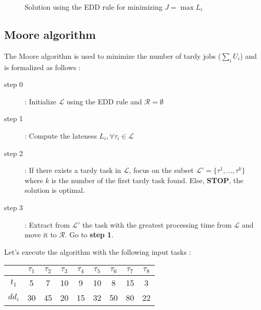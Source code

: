 \begin{figure}[h!]
    \centering
    \caption{\label{scheduling:sol_edd}Solution using the EDD rule for minimizing $J = \max L_i$}
\end{figure}

\subsection{Moore algorithm}

The Moore algorithm is used to minimize the number of tardy jobs ($\sum_i U_i$) and is formalized as follows : 
\begin{description}
    \item[step 0] : Initialize $\mathcal L$ using the EDD rule and $\mathcal R = \emptyset$
    \item[step 1] : Compute the lateness $L_i, \forall\tau_i\in\mathcal L$
    \item[step 2] : If there exists a tardy task in $\mathcal L$, focus on the subset $\mathcal L' = \{ \tau^1, ..., \tau^k \}$ where $k$ is the number of the first tardy task found. Else, \textbf{STOP}, the solution is optimal.
    \item[step 3] : Extract from $\mathcal L'$ the task with the greatest processing time from $\mathcal L$ and move it to $\mathcal R$. Go to \textbf{step 1}.
\end{description}

Let's execute the algorithm with the following input tasks : 
\begin{center}
    \begin{tabular}{|c|c|c|c|c|c|c|c|c|}
    \hline
        & $\tau_1$ & $\tau_2$ & $\tau_3$ & $\tau_4$ & $\tau_5$ & $\tau_6$ & $\tau_7$ & $\tau_8$\\\hline
    $t_1$ & 5 & 7 & 10 & 9 & 10 & 8 & 15 & 3\\\hline
    $dd_i$ & 30 & 45 & 20 & 15 & 32 & 50 & 80 & 22\\\hline
    \end{tabular}
\end{center}

